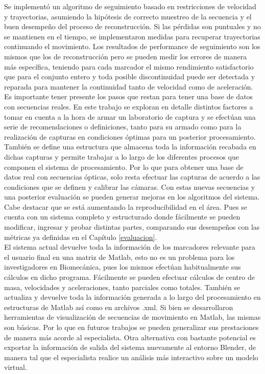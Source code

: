 Se implementó un algoritmo de seguimiento basado en restricciones de velocidad y trayectorias, asumiendo la hipótesis de correcto muestreo de la secuencia y el buen desempeño del proceso de reconstrucción. Si las pérdidas son puntuales y no se mantienen en el tiempo, se implementaron medidas para recuperar trayectorias continuando el movimiento. Los resultados de performance de seguimiento son los mismos que los de reconstrucción pero se pueden medir los errores de manera más específica, teniendo para cada marcador el mismo rendimiento satisfactorio que para el conjunto entero y toda posible discontinuidad puede ser detectada y reparada para mantener la continuidad tanto de velocidad como de aceleración. 
\\ 


Es importante tener presente los pasos que restan para tener una base de datos con secuencias reales.
En este trabajo se exploran en detalle distintos factores a tomar en cuenta  a la hora de armar un laboratorio de captura y se efectúan una serie de recomendaciones o definiciones, tanto para su armado como para la realización de capturas en condiciones óptimas para un posterior procesamiento. También se define una estructura que almacena toda la información recabada en dichas capturas y permite trabajar a lo largo de los diferentes procesos que componen el sistema de procesamiento. Por lo que para obtener una base de datos real con secuencias ópticas, solo resta efectuar las capturas de acuerdo a las condiciones que se definen y calibrar las cámaras. 
Con estas nuevas secuencias y una posterior evaluación se pueden generar mejoras en los algoritmos del sistema.\\


Cabe destacar que se está aumentando la reproducibilidad en el área. Pues se cuenta con un sistema completo y estructurado donde fácilmente se pueden modificar, ingresar y probar distintas partes, comparando sus desempeños con las métricas ya definidas en el Capítulo \ref{evaluacion}.\\ 



El sistema actual devuelve toda la información de los marcadores relevante para el usuario final en una matriz de Matlab, esto no es un problema para los investigadores en Biomecánica, pues los mismos efectúan habitualmente sus cálculos en dicho programa. Fácilmente se pueden efectuar cálculos de centro de masa, velocidades y aceleraciones, tanto parciales como totales.
También se actualiza y devuelve toda la información generada a lo largo del procesamiento en estructuras de Matlab así como en archivos .xml. Si bien se desarrollaron herramientas de visualización de secuencias de movimiento en Matlab, las mismas son básicas. Por lo que en futuros trabajos se pueden generalizar sus prestaciones de manera más acorde al especialista. Otra alternativa con bastante potencial es exportar la información de salida del sistema nuevamente al entorno Blender, de manera tal que el especialista realice un análisis más interactivo sobre un modelo virtual.\\ 



